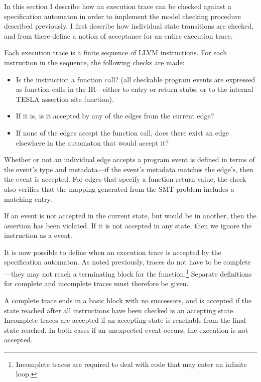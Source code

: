 In this section I describe how an execution trace can be checked against a
specification automaton in order to implement the model checking procedure
described previously. I first describe how individual state transitions are
checked, and from there define a notion of acceptance for an entire execution
trace.

Each execution trace is a finite sequence of LLVM instructions. For each
instruction in the sequence, the following checks are made:
\begin{itemize}
  \item Is the instruction a function call? (all checkable program events are
    expressed as function calls in the IR---either to entry or return stubs, or
    to the internal TESLA assertion site function).
  \item If it is, is it accepted by any of the edges from the current edge?
  \item If none of the edges accept the function call, does there exist an edge
    elsewhere in the automaton that would accept it?
\end{itemize}

Whether or not an individual edge accepts a program event is defined in terms of
the event's type and metadata---if the event's metadata matches the edge's, then
the event is accepted. For edges that specify a function return value, the check
also verifies that the mapping generated from the SMT problem includes a
matching entry.

If an event is not accepted in the current state, but would be in another, then
the assertion has been violated. If it is not accepted in any state, then we
ignore the instruction as a  event.

It is now possible to define when an execution trace is accepted by the
specification automaton. As noted previously, traces do not have to be
complete---they may not reach a terminating block for the
function.\footnote{Incomplete traces are required to deal with code that may
enter an infinite loop.} Separate definitions for complete and incomplete traces
must therefore be given.

A complete trace ends in a basic block with no successors, and is accepted if
the state reached after all instructions have been checked is an accepting
state. Incomplete traces are accepted if an accepting state is reachable from
the final state reached. In both cases if an unexpected event occurs, the
execution is not accepted.

